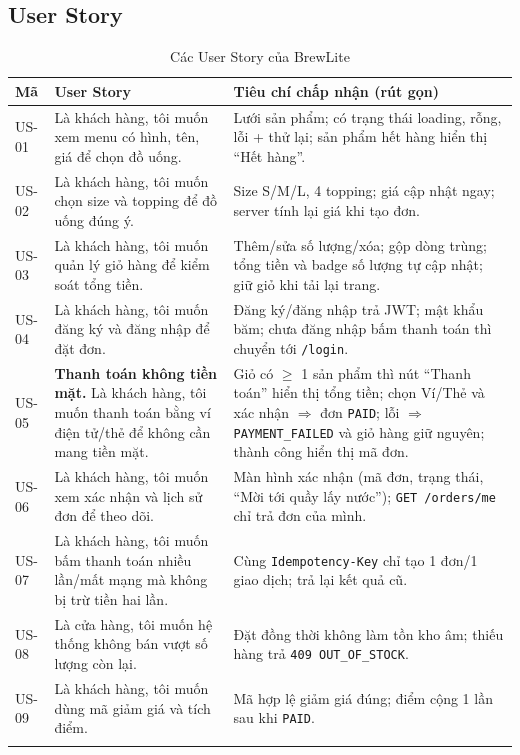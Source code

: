 \documentclass[a4paper]{article}
\newcommand{\st}[1]{\texttt{#1}}
\begin{document}
\subsection{User Story}
\begin{longtable}{|L{1.4cm}|L{5.4cm}|L{6.3cm}|}
\hline
\textbf{Mã} & \textbf{User Story} & \textbf{Tiêu chí chấp nhận (rút gọn)} \\ \hline
\endhead
US-01 & Là khách hàng, tôi muốn xem menu có hình, tên, giá để chọn đồ uống. & Lưới sản phẩm; có trạng thái loading, rỗng, lỗi + thử lại; sản phẩm hết hàng hiển thị ``Hết hàng''. \\ \hline
US-02 & Là khách hàng, tôi muốn chọn size và topping để đồ uống đúng ý. & Size S/M/L, 4 topping; giá cập nhật ngay; server tính lại giá khi tạo đơn. \\ \hline
US-03 & Là khách hàng, tôi muốn quản lý giỏ hàng để kiểm soát tổng tiền. & Thêm/sửa số lượng/xóa; gộp dòng trùng; tổng tiền và badge số lượng tự cập nhật; giữ giỏ khi tải lại trang. \\ \hline
US-04 & Là khách hàng, tôi muốn đăng ký và đăng nhập để đặt đơn. & Đăng ký/đăng nhập trả JWT; mật khẩu băm; chưa đăng nhập bấm thanh toán thì chuyển tới \texttt{/login}. \\ \hline
US-05 & \textbf{Thanh toán không tiền mặt.} Là khách hàng, tôi muốn thanh toán bằng ví điện tử/thẻ để không cần mang tiền mặt. & Giỏ có $\ge$ 1 sản phẩm thì nút ``Thanh toán'' hiển thị tổng tiền; chọn Ví/Thẻ và xác nhận $\Rightarrow$ đơn \st{PAID}; lỗi $\Rightarrow$ \st{PAYMENT\_FAILED} và giỏ hàng giữ nguyên; thành công hiển thị mã đơn. \\ \hline
US-06 & Là khách hàng, tôi muốn xem xác nhận và lịch sử đơn để theo dõi. & Màn hình xác nhận (mã đơn, trạng thái, ``Mời tới quầy lấy nước''); \texttt{GET /orders/me} chỉ trả đơn của mình. \\ \hline
US-07 & Là khách hàng, tôi muốn bấm thanh toán nhiều lần/mất mạng mà không bị trừ tiền hai lần. & Cùng \texttt{Idempotency-Key} chỉ tạo 1 đơn/1 giao dịch; trả lại kết quả cũ. \\ \hline
US-08 & Là cửa hàng, tôi muốn hệ thống không bán vượt số lượng còn lại. & Đặt đồng thời không làm tồn kho âm; thiếu hàng trả \texttt{409 OUT\_OF\_STOCK}. \\ \hline
US-09 & Là khách hàng, tôi muốn dùng mã giảm giá và tích điểm. & Mã hợp lệ giảm giá đúng; điểm cộng 1 lần sau khi \st{PAID}. \\ \hline
\caption{Các User Story của BrewLite}
\end{longtable}
\end{document}
